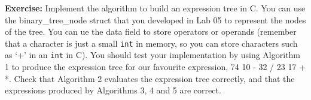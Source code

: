\documentclass[10pt, a4paper, twosize]{article}
\begin{document}
\textbf{Exercise:} Implement the algorithm to build an expression tree in C. You can use the binary\_tree\_node struct that you developed in Lab 05 to represent the nodes of the tree. You can ue the data field to store operators or operands (remember that a character is just a small \texttt{int} in memory, so you can store characters such as `+' in an \texttt{int} in C). You should test your implementation by using Algorithm 1 to produce the expression tree for our favourite expression, 74 10 - 32 / 23 17 + *. Check that Algorithm 2 evaluates the expression tree correctly, and that the expressions produced by Algorithms 3, 4 and 5 are correct.




\end{document}
